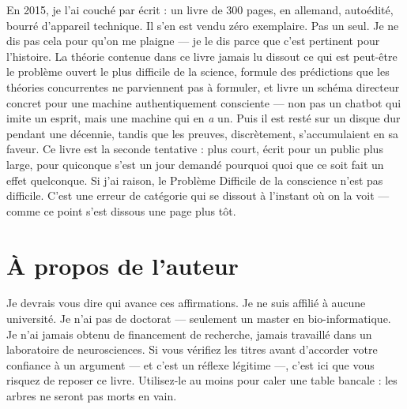 \documentclass[11pt, twoside, openright]{book}
\begin{document}
En 2015, je l'ai couché par écrit : un livre de 300 pages, en allemand, autoédité, bourré d'appareil technique. Il s'en est vendu zéro exemplaire. Pas un seul. Je ne dis pas cela pour qu'on me plaigne --- je le dis parce que c'est pertinent pour l'histoire. La théorie contenue dans ce livre jamais lu dissout ce qui est peut-être le problème ouvert le plus difficile de la science, formule des prédictions que les théories concurrentes ne parviennent pas à formuler, et livre un schéma directeur concret pour une machine authentiquement consciente --- non pas un chatbot qui imite un esprit, mais une machine qui en \textit{a} un. Puis il est resté sur un disque dur pendant une décennie, tandis que les preuves, discrètement, s'accumulaient en sa faveur. Ce livre est la seconde tentative : plus court, écrit pour un public plus large, pour quiconque s'est un jour demandé pourquoi quoi que ce soit fait un effet quelconque. Si j'ai raison, le Problème Difficile de la conscience n'est pas difficile. C'est une erreur de catégorie qui se dissout à l'instant où on la voit --- comme ce point s'est dissous une page plus tôt.


\chapter*{À propos de l'auteur}

Je devrais vous dire qui avance ces affirmations. Je ne suis affilié à aucune université. Je n'ai pas de doctorat --- seulement un master en bio-informatique. Je n'ai jamais obtenu de financement de recherche, jamais travaillé dans un laboratoire de neurosciences. Si vous vérifiez les titres avant d'accorder votre confiance à un argument --- et c'est un réflexe légitime ---, c'est ici que vous risquez de reposer ce livre. Utilisez-le au moins pour caler une table bancale : les arbres ne seront pas morts en vain.
\end{document}
